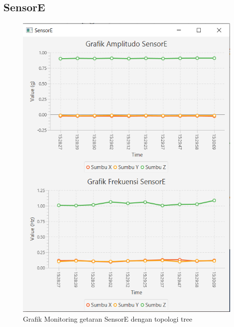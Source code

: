 \subsection{SensorE}
\begin{figure}[H] 
	\centering  
	\includegraphics[scale=1]{Lampiran/HasilPengujian/sensorE_treeRooftop.PNG} 
	\caption[Grafik Monitoring getaran SensorE dengan topologi tree]{Grafik Monitoring getaran SensorE dengan topologi tree}
	\label{fig:grafik_E_tree_rooftop} 
\end{figure}
